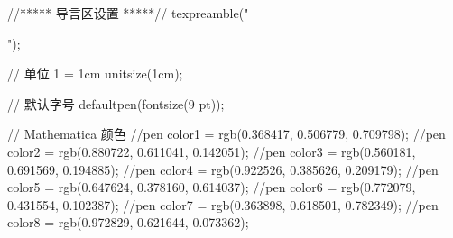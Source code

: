 \begin{asydef}
//***** 导言区设置 *****//
texpreamble("

\usepackage[no-math]{fontspec}
	\setmainfont{Source Sans Pro Light}

\usepackage{amsmath}

\usepackage{unicode-math}

\usepackage{xeCJK}


\usepackage[svgnames]{xcolor}

");


// 单位 1 = 1cm
unitsize(1cm);

// 默认字号
defaultpen(fontsize(9 pt));

// Mathematica 颜色
//pen color1 = rgb(0.368417, 0.506779, 0.709798);
//pen color2 = rgb(0.880722, 0.611041, 0.142051);
//pen color3 = rgb(0.560181, 0.691569, 0.194885);
//pen color4 = rgb(0.922526, 0.385626, 0.209179);
//pen color5 = rgb(0.647624, 0.378160, 0.614037);
//pen color6 = rgb(0.772079, 0.431554, 0.102387);
//pen color7 = rgb(0.363898, 0.618501, 0.782349);
//pen color8 = rgb(0.972829, 0.621644, 0.073362);

\end{asydef}